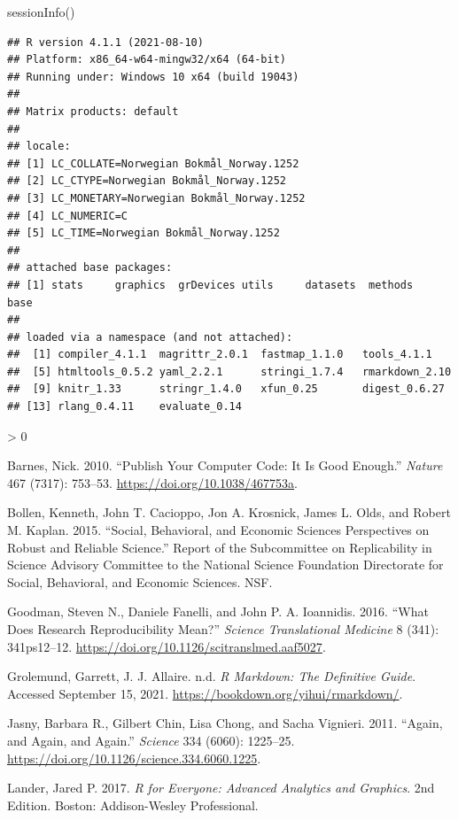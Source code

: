 \documentclass[
]{article}
\newenvironment{Shaded}{\begin{snugshade}}{\end{snugshade}}
\newcommand{\FunctionTok}[1]{\textcolor[rgb]{0.00,0.00,0.00}{#1}}
\newcommand{\NormalTok}[1]{#1}
\newlength{\cslhangindent}
\newenvironment{CSLReferences}[2] %
 {%
  \setlength{\parindent}{0pt}
  \ifodd #1 \everypar{\setlength{\hangindent}{\cslhangindent}}\ignorespaces\fi
  \ifnum #2 > 0
  \setlength{\parskip}{#2\baselineskip}
  \fi
 }%
 {}
\begin{document}
\begin{Shaded}
\begin{Highlighting}[]
\FunctionTok{sessionInfo}\NormalTok{()}
\end{Highlighting}
\end{Shaded}

\begin{verbatim}
## R version 4.1.1 (2021-08-10)
## Platform: x86_64-w64-mingw32/x64 (64-bit)
## Running under: Windows 10 x64 (build 19043)
## 
## Matrix products: default
## 
## locale:
## [1] LC_COLLATE=Norwegian Bokmål_Norway.1252 
## [2] LC_CTYPE=Norwegian Bokmål_Norway.1252   
## [3] LC_MONETARY=Norwegian Bokmål_Norway.1252
## [4] LC_NUMERIC=C                            
## [5] LC_TIME=Norwegian Bokmål_Norway.1252    
## 
## attached base packages:
## [1] stats     graphics  grDevices utils     datasets  methods   base     
## 
## loaded via a namespace (and not attached):
##  [1] compiler_4.1.1  magrittr_2.0.1  fastmap_1.1.0   tools_4.1.1    
##  [5] htmltools_0.5.2 yaml_2.2.1      stringi_1.7.4   rmarkdown_2.10 
##  [9] knitr_1.33      stringr_1.4.0   xfun_0.25       digest_0.6.27  
## [13] rlang_0.4.11    evaluate_0.14
\end{verbatim}

\hypertarget{refs}{}
\begin{CSLReferences}{1}{0}
\leavevmode\hypertarget{ref-barnes_publish_2010}{}%
Barnes, Nick. 2010. {``Publish {Your} {Computer} {Code}: {It} {Is}
{Good} {Enough}.''} \emph{Nature} 467 (7317): 753--53.
\url{https://doi.org/10.1038/467753a}.

\leavevmode\hypertarget{ref-bollen_social_2015}{}%
Bollen, Kenneth, John T. Cacioppo, Jon A. Krosnick, James L. Olds, and
Robert M. Kaplan. 2015. {``Social, {Behavioral}, and {Economic}
{Sciences} {Perspectives} on {Robust} and {Reliable} {Science}.''}
Report of the Subcommittee on Replicability in Science Advisory
Committee to the National Science Foundation Directorate for Social,
Behavioral, and Economic Sciences. NSF.

\leavevmode\hypertarget{ref-goodman_what_2016}{}%
Goodman, Steven N., Daniele Fanelli, and John P. A. Ioannidis. 2016.
{``What {Does} {Research} {Reproducibility} {Mean}?''} \emph{Science
Translational Medicine} 8 (341): 341ps12--12.
\url{https://doi.org/10.1126/scitranslmed.aaf5027}.

\leavevmode\hypertarget{ref-grolemund_r_nodate}{}%
Grolemund, Garrett, J. J. Allaire. n.d. \emph{R {Markdown}: {The}
{Definitive} {Guide}}. Accessed September 15, 2021.
\url{https://bookdown.org/yihui/rmarkdown/}.

\leavevmode\hypertarget{ref-jasny_again_2011}{}%
Jasny, Barbara R., Gilbert Chin, Lisa Chong, and Sacha Vignieri. 2011.
{``Again, and {Again}, and {Again}.''} \emph{Science} 334 (6060):
1225--25. \url{https://doi.org/10.1126/science.334.6060.1225}.

\leavevmode\hypertarget{ref-lander_r_2017}{}%
Lander, Jared P. 2017. \emph{R for {Everyone}: {Advanced} {Analytics}
and {Graphics}}. 2nd Edition. Boston: Addison-Wesley Professional.

\end{CSLReferences}
\end{document}
